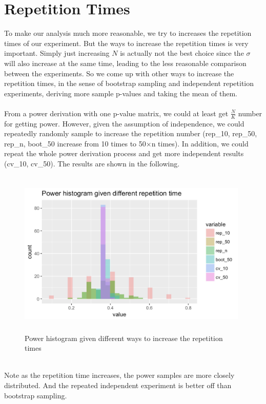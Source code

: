 \documentclass[10pt,english]{article}\usepackage{graphicx, color}
\numberwithin{equation}{section}
\numberwithin{figure}{section}
\begin{document}
\section{Repetition Times}
To make our analysis much more reasonable, we try to increases the repetition times of our experiment. But the ways to increase the repetition times is very important. Simply just increasing $N$ is actually not the best choice since the $\sigma$ will also increase at the same time, leading to the less reasonable comparison between the experiments. So we come up with other ways to increase the repetition times, in the sense of bootstrap sampling and independent repetition experiments, deriving more sample p-values and taking the mean of them. \\
\quad\\
From a power derivation with one p-value matrix, we could at least get $\frac{N}{K}$ number for getting power. However, given the assumption of independence, we could repeatedly randomly sample to increase the repetition number (rep\_10, rep\_50, rep\_n, boot\_50 increase from 10 times to 50$\times$n times). In addition, we could repeat the whole power derivation process and get more independent results (cv\_10, cv\_50). The results are shown in the following.
\begin{figure}[htbp]
\centering\includegraphics[width=11cm,height=8cm]{hist}
\caption{Power histogram given different ways to increase the repetition times}
\end{figure}
\quad\\
Note as the repetition time increases, the power samples are more closely distributed. And the repeated independent experiment is better off than bootstrap sampling. \\
\end{document}
